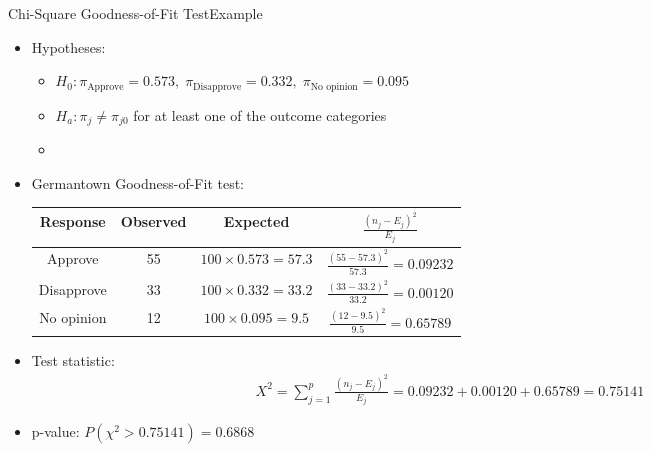 \documentclass[xcolor=dvipsnames]{beamer}
\begin{document}
\begin{frame}{Chi-Square Goodness-of-Fit Test}{Example}
\begin{itemize}
	\item Hypotheses:
	\begin{itemize}
		\item $H_0: \pi_{\text{Approve}} = 0.573,\; \pi_{\text{Disapprove}} = 0.332,\; \pi_{\text{No opinion}}=0.095$
		\item $H_a: \pi_j \neq \pi_{j0}$ for at least one of the outcome categories
		\item[]
	\end{itemize}
	\item Germantown Goodness-of-Fit test:
	{\scriptsize
	\begin{center}
		\begin{tabular}{cccc}
			\hline
			Response & Observed & Expected & $\frac{(n_j-E_j)^2}{E_j}$ \\ \hline \hline
			Approve & 55 & $100 \times 0.573 = 57.3$ & $\frac{(55-57.3)^2}{57.3} = 0.09232$\\
			Disapprove & 33 & $100 \times 0.332 = 33.2$ & $\frac{(33-33.2)^2}{33.2} = 0.00120$\\
			No opinion & 12 & $100 \times 0.095 = 9.5$ & $\frac{(12-9.5)^2}{9.5}=0.65789$\\ \hline
		\end{tabular}
	\end{center}}
	\vspace{1mm}
	\item Test statistic: 
	\begin{gather*}
	X^2 = \sum_{j=1}^p \frac{(n_j-E_j)^2}{E_j} = 0.09232 + 0.00120 + 0.65789 = 0.75141
	\end{gather*}
	\item p-value: $P(\chi^2 > 0.75141) = 0.6868$
\end{itemize}
\end{frame}
\end{document}
